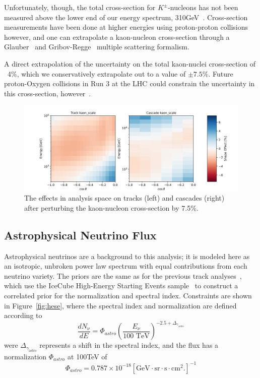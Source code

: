 \documentclass[main.tex]{subfiles}
\begin{document}
Unfortunately, though, the total cross-section for $K^{\pm}$-nucleons has not been measured above the lower end of our energy spectrum, 310GeV~\cite{PhysRevD.98.030001}. 
Cross-section measurements have been done at higher energies using proton-proton collisions however, and one can extrapolate a kaon-nucleon cross-section through a Glauber~\cite{PhysRev.100.242, GLAUBER1970135} and Gribov-Regge~\cite{Gribov:1967vfb} multiple scattering formalism. 

A direct extrapolation of the uncertainty on the total kaon-nuclei cross-section of ~4\%, which we conservatively extrapolate out to a value of $\pm 7.5$\%. 
Future proton-Oxygen collisions in Run 3 at the LHC could constrain the uncertainty in this cross-section, however~\cite{Dembinski2020dam}.

\begin{figure}
    \centering
    \includegraphics[width=0.8\linewidth]{figures/systematics/kaon_scale.png}
    \caption{The effects in analysis space on tracks (left) and cascades (right) after perturbing the kaon-nucleon cross-section by 7.5\%.}\label{fig:kaon}
\end{figure}

\subsection{Astrophysical Neutrino Flux}

Astrophysical neutrinos are a background to this analysis; it is modeled here as an isotropic, unbroken power law spectrum with equal contributions from each neutrino variety.
The priors are the same as for the previous track analyses~\cite{Aartsen_2020, Aartsen_2020_prd}, which use the IceCube High-Energy Starting Events sample~\cite{2021hese} to construct a correlated prior for the normalization and spectral index. 
Constraints are shown in Figure~\ref{fig:hese}, where the spectral index and normalization are defined according to 
\begin{equation}
    \dfrac{d N_{\nu}}{dE}  = \Phi_{astro}\left(\dfrac{E_{\nu}}{100\text{ TeV}}\right)^{-2.5 + \Delta_{\gamma_{\text{astro}}} }
\end{equation}
were $\Delta_{\gamma_{\text{astro}}}$ represents a shift in the spectral index, and the flux has a normalization $\Phi_{astro}$ at 100TeV of 
\begin{equation}
\Phi_{astro} = 0.787\times 10^{-18} \left[\text{GeV}\cdot\text{sr}\cdot\text{s}\cdot\text{cm}^{2}.\right]^{-1}
\end{equation}
\end{document}
